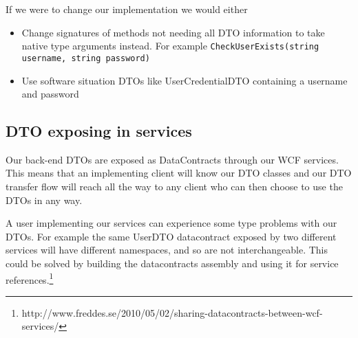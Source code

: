\documentclass[../report.tex]{subfiles}
\begin{document}
If we were to change our implementation we would either

\begin{itemize}
\item Change signatures of methods not needing all DTO information to take native type arguments instead. For example \texttt{CheckUserExists(string username, string password)}
\item Use software situation DTOs like UserCredentialDTO containing a username and password
\end{itemize}


\subsection{DTO exposing in services}

Our back-end DTOs are exposed as DataContracts through our WCF services. This means that an implementing client will know our DTO classes and our DTO transfer flow will reach all the way to any client who can then choose to use the DTOs in any way.

A user implementing our services can experience some type problems with our DTOs. For example the same UserDTO datacontract exposed by two different services will have different namespaces, and so are not interchangeable. This could be solved by building the datacontracts assembly and using it for service references.\footnote{http://www.freddes.se/2010/05/02/sharing-datacontracts-between-wcf-services/} 
\end{document}
